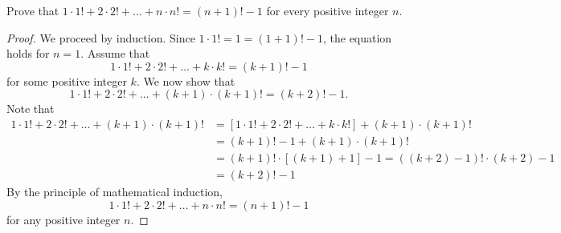 \documentclass[12pt]{article}
\newenvironment{problem}[2][Problem]{\begin{trivlist}
		\item[\hskip \labelsep {\bfseries #1}\hskip \labelsep {\bfseries #2.}]}{\end{trivlist}}
\begin{document}
\begin{problem}{13}
	Prove that $1\cdot 1! +2\cdot 2! + \ldots+n\cdot n! = (n+1)!-1$ for every positive integer $n$.
	\begin{proof}
		We proceed by induction. Since $1\cdot1! = 1 = (1+1)!-1$, the equation holds for $n=1$. Assume that
		\begin{equation*}
			1\cdot 1!+ 2\cdot 2! + \ldots + k\cdot k! = (k+1)!-1
		\end{equation*}
		for some positive integer $k$. We now show that
		\begin{equation*}
			1\cdot 1!+ 2\cdot 2! + \ldots + (k+1)\cdot (k+1)! = (k+2)!-1.
		\end{equation*}
		Note that 
		\begin{align*}
			1\cdot 1!+ 2\cdot 2! + \ldots + (k+1)\cdot (k+1)! &= \left[ 1\cdot 1!+ 2\cdot 2! + \ldots + k\cdot k!\right] + (k+1)\cdot (k+1)!\\
			&= (k+1)!-1+(k+1)\cdot (k+1)!\\
			&= (k+1)!\cdot [(k+1)+1]-1 = ((k+2)-1)!\cdot (k+2) -1\\
			&= (k+2)!-1  
		\end{align*}
	By the principle of mathematical induction, 
	\begin{equation*}
		1\cdot 1! +2\cdot 2! + \ldots+n\cdot n! = (n+1)!-1
	\end{equation*}
	for any positive integer $n$.
	\end{proof}
\end{problem}
\end{document}
